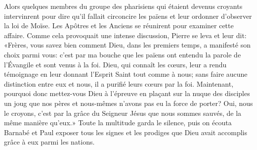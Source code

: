 Alors quelques membres du groupe des pharisiens qui étaient devenus croyants
	intervinrent pour dire qu’il fallait circoncire les païens
	et leur ordonner d’observer la loi de Moïse.
Les Apôtres et les Anciens se réunirent pour examiner cette affaire.
Comme cela provoquait une intense discussion, Pierre se leva et leur dit:
	«Frères, vous savez bien comment Dieu, dans les premiers temps,
	a manifesté son choix parmi vous:
	c’est par ma bouche que les païens ont entendu la parole de l’Évangile
	et sont venus à la foi.
Dieu, qui connaît les cœurs, leur a rendu témoignage
	en leur donnant l’Esprit Saint tout comme à nous;
	sans faire aucune distinction entre eux et nous,
	il a purifié leurs cœurs par la foi.
Maintenant, pourquoi donc mettez-vous Dieu à l’épreuve
	en plaçant sur la nuque des disciples
		un joug que nos pères et nous-mêmes n’avons pas eu la force de porter?
Oui, nous le croyons,
	c’est par la grâce du Seigneur Jésus que nous sommes sauvés,
	de la même manière qu’eux.»
Toute la multitude garda le silence,
	puis on écouta Barnabé et Paul exposer tous les signes et les prodiges
	que Dieu avait accomplis grâce à eux parmi les nations.
